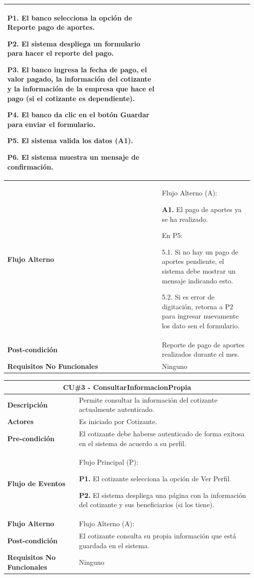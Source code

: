 \documentclass[12pt,a4paper]{article}
\begin{document}
\begin{center}
\begin{tabular}{|p{5.5cm}| p{9.5cm}|}
\textbf{P1.} El banco selecciona la opción de Reporte pago de aportes.

\textbf{P2.} El sistema despliega un formulario para hacer el reporte del pago.

\textbf{P3.} El banco ingresa la fecha de pago, el valor pagado, la información del cotizante y la información de la empresa que hace el pago (si el cotizante es dependiente).

\textbf{P4.} El banco da clic en el botón Guardar para enviar el formulario.

\textbf{P5.} El sistema valida los datos (A1).

\textbf{P6.} El sistema muestra un mensaje de confirmación.
\\
\hline 
\textbf{Flujo Alterno} &  Flujo Alterno (A):

\textbf{A1.} El pago de aportes ya se ha realizado.

	En P5:
	
	5.1. Si no hay un pago de aportes pendiente, el sistema debe mostrar un mensaje indicando esto.
	
	5.2. Si es error de digitación, retorna a P2 para ingresar nuevamente los dato sen el formulario. \\ 
\hline 
\textbf{Post-condición}  & Reporte de pago de aportes realizados durante el mes. \\ 
\hline 
\textbf{Requisitos No Funcionales} & Ninguno \\ 
\hline 
\end{tabular}
\vspace{5mm}

\begin{tabular}{|p{5.5cm}| p{9.5cm}|}
\hline 
\multicolumn{2}{|c|}{\textbf{CU\#3 - ConsultarInformacionPropia}} \\ 
\hline 
\textbf{Descripción} & Permite consultar la información del cotizante actualmente autenticado. \\ 
\hline 
\textbf{Actores} & Es iniciado por Cotizante. \\ 
\hline 
\textbf{Pre-condición} & El cotizante debe haberse autenticado de forma exitosa en el sistema de acuerdo a su perfil. \\ 
\hline 
\textbf{Flujo de Eventos} & Flujo Principal (P):

\textbf{P1.} El cotizante selecciona la opción de Ver Perfil.

\textbf{P2.} El sistema despliega una página con la información del cotizante y sus beneficiarios (si los tiene).
\\
\hline 
\textbf{Flujo Alterno} &  Flujo Alterno (A):
\\ 
\hline 
\textbf{Post-condición}  & El cotizante consulta su propia información que está guardada en el sistema. \\ 
\hline 
\textbf{Requisitos No Funcionales} & Ninguno \\ 
\hline 
\end{tabular}
\vspace{5mm}


\end{center}
\end{document}
